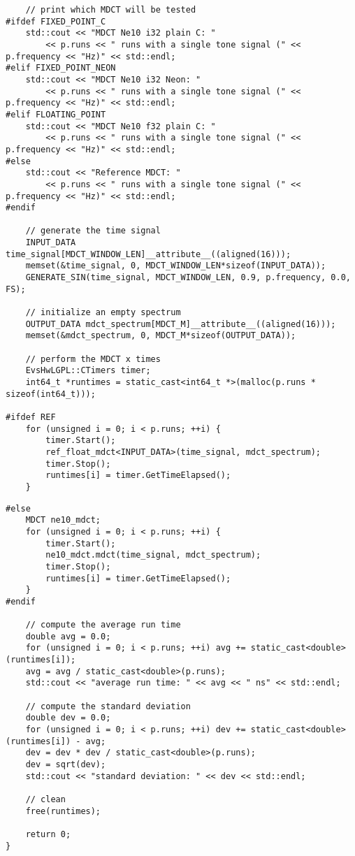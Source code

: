 \documentclass{article}
\begin{document}
\begin{lstlisting}
    // print which MDCT will be tested
#ifdef FIXED_POINT_C
    std::cout << "MDCT Ne10 i32 plain C: "
        << p.runs << " runs with a single tone signal (" << p.frequency << "Hz)" << std::endl;
#elif FIXED_POINT_NEON
    std::cout << "MDCT Ne10 i32 Neon: "
        << p.runs << " runs with a single tone signal (" << p.frequency << "Hz)" << std::endl;
#elif FLOATING_POINT
    std::cout << "MDCT Ne10 f32 plain C: "
        << p.runs << " runs with a single tone signal (" << p.frequency << "Hz)" << std::endl;
#else
    std::cout << "Reference MDCT: "
        << p.runs << " runs with a single tone signal (" << p.frequency << "Hz)" << std::endl;
#endif

    // generate the time signal
    INPUT_DATA time_signal[MDCT_WINDOW_LEN]__attribute__((aligned(16)));
    memset(&time_signal, 0, MDCT_WINDOW_LEN*sizeof(INPUT_DATA));
    GENERATE_SIN(time_signal, MDCT_WINDOW_LEN, 0.9, p.frequency, 0.0, FS);

    // initialize an empty spectrum
    OUTPUT_DATA mdct_spectrum[MDCT_M]__attribute__((aligned(16)));
    memset(&mdct_spectrum, 0, MDCT_M*sizeof(OUTPUT_DATA));

    // perform the MDCT x times
    EvsHwLGPL::CTimers timer;
    int64_t *runtimes = static_cast<int64_t *>(malloc(p.runs * sizeof(int64_t)));

#ifdef REF
    for (unsigned i = 0; i < p.runs; ++i) {
        timer.Start();
        ref_float_mdct<INPUT_DATA>(time_signal, mdct_spectrum);
        timer.Stop();
        runtimes[i] = timer.GetTimeElapsed();
    }
\end{lstlisting}
\newpage
\begin{lstlisting}
#else
    MDCT ne10_mdct;
    for (unsigned i = 0; i < p.runs; ++i) {
        timer.Start();
        ne10_mdct.mdct(time_signal, mdct_spectrum);
        timer.Stop();
        runtimes[i] = timer.GetTimeElapsed();
    }
#endif

    // compute the average run time
    double avg = 0.0;
    for (unsigned i = 0; i < p.runs; ++i) avg += static_cast<double>(runtimes[i]);
    avg = avg / static_cast<double>(p.runs);
    std::cout << "average run time: " << avg << " ns" << std::endl;

    // compute the standard deviation
    double dev = 0.0;
    for (unsigned i = 0; i < p.runs; ++i) dev += static_cast<double>(runtimes[i]) - avg;
    dev = dev * dev / static_cast<double>(p.runs);
    dev = sqrt(dev);
    std::cout << "standard deviation: " << dev << std::endl;

    // clean
    free(runtimes);

    return 0;
}
\end{lstlisting}
\end{document}
